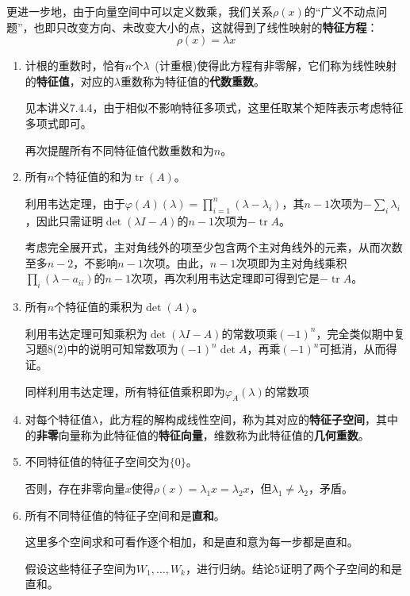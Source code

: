 \documentclass[a4paper,UTF8,fontset=windows]{ctexart}
\DeclareMathOperator{\tr}{tr}
\newcommand*{\note}{\noindent *}
\begin{document}
更进一步地，由于向量空间中可以定义数乘，我们关系$\rho(x)$的``广义不动点问题''，也即只改变方向、未改变大小的点，这就得到了线性映射的\textbf{特征方程}：
$$\rho(x)=\lambda x$$
\begin{enumerate}
    \item 计根的重数时，恰有$n$个$\lambda$\ (计重根)使得此方程有非零解，它们称为线性映射的\textbf{特征值}，对应的$\lambda$重数称为特征值的\textbf{代数重数}。
    
    见本讲义7.4.4，由于相似不影响特征多项式，这里任取某个矩阵表示考虑特征多项式即可。

    \note 再次提醒所有不同特征值代数重数和为$n$。
    
    \item 所有$n$个特征值的和为$\tr(A)$。
    
    利用韦达定理，由于$\varphi(A)(\lambda)=\prod_{i=1}^n(\lambda-\lambda_i)$，其$n-1$次项为$-\sum_i\lambda_i$，因此只需证明$\det(\lambda I-A)$的$n-1$次项为$-\tr A$。

    考虑完全展开式，主对角线外的项至少包含两个主对角线外的元素，从而次数至多$n-2$，不影响$n-1$次项。由此，$n-1$次项即为主对角线乘积$\prod_i(\lambda-a_{ii})$的$n-1$次项，再次利用韦达定理即可得到它是$-\tr A$。
    
    \item 所有$n$个特征值的乘积为$\det(A)$。
    
    利用韦达定理可知乘积为$\det(\lambda I-A)$的常数项乘$(-1)^n$，完全类似期中复习题8(2)中的说明可知常数项为$(-1)^n\det A$，再乘$(-1)^n$可抵消，从而得证。
    
    同样利用韦达定理，所有特征值乘积即为$\varphi_A(\lambda)$的常数项
    
    \item 对每个特征值$\lambda$，此方程的解构成线性空间，称为其对应的\textbf{特征子空间}，其中的\textbf{非零}向量称为此特征值的\textbf{特征向量}，维数称为此特征值的\textbf{几何重数}。
    
    \item 不同特征值的特征子空间交为$\{0\}$。
    
    否则，存在非零向量$x$使得$\rho(x)=\lambda_1x=\lambda_2x$，但$\lambda_1\ne\lambda_2$，矛盾。

    \item 所有不同特征值的特征子空间和是\textbf{直和}。
    
    \note 这里多个空间求和可看作逐个相加，和是直和意为每一步都是直和。

    假设这些特征子空间为$W_1,\dots,W_k$，进行归纳。结论5证明了两个子空间的和是直和。


\end{enumerate}
\end{document}
